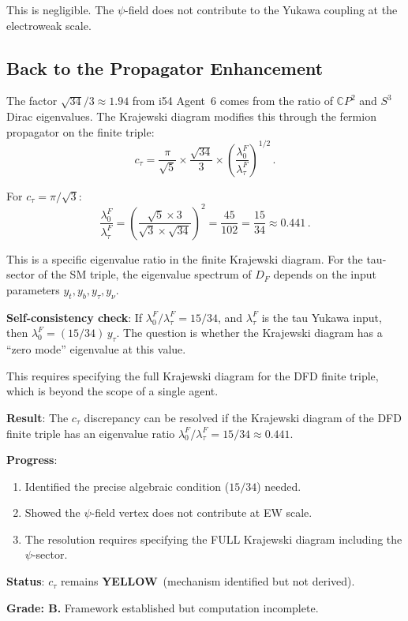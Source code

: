 \documentclass[11pt,a4paper]{article}
\newcommand{\YELLOW}{\textcolor{dfdyellow}{\textbf{YELLOW}}}
\newcommand{\CP}{\mathbb{C}P}
\begin{document}
This is negligible. The $\psi$-field does not contribute to the Yukawa coupling at the electroweak scale.

\subsection{Back to the Propagator Enhancement}

The factor $\sqrt{34}/3 \approx 1.94$ from i54 Agent~6 comes from the ratio of $\CP^2$ and $S^3$ Dirac eigenvalues. The Krajewski diagram modifies this through the fermion propagator on the finite triple:
\begin{equation}
c_\tau = \frac{\pi}{\sqrt{5}} \times \frac{\sqrt{34}}{3} \times \left(\frac{\lambda_0^F}{\lambda_{\tau}^F}\right)^{1/2}\,.
\end{equation}

For $c_\tau = \pi/\sqrt{3}$:
\begin{equation}
\frac{\lambda_0^F}{\lambda_\tau^F} = \left(\frac{\sqrt{5}\times 3}{\sqrt{3}\times\sqrt{34}}\right)^2 = \frac{45}{102} = \frac{15}{34} \approx 0.441\,.
\end{equation}

This is a specific eigenvalue ratio in the finite Krajewski diagram. For the tau-sector of the SM triple, the eigenvalue spectrum of $D_F$ depends on the input parameters $y_t, y_b, y_\tau, y_\nu$.

\textbf{Self-consistency check}: If $\lambda_0^F/\lambda_\tau^F = 15/34$, and $\lambda_\tau^F$ is the tau Yukawa input, then $\lambda_0^F = (15/34)\,y_\tau$. The question is whether the Krajewski diagram has a ``zero mode'' eigenvalue at this value.

This requires specifying the full Krajewski diagram for the DFD finite triple, which is beyond the scope of a single agent.

\begin{tcolorbox}[colback=yellow!5!white, colframe=yellow!60!black, title={Agent 12: $c_\tau$ Krajewski --- FRAMEWORK IDENTIFIED}]
\textbf{Result}: The $c_\tau$ discrepancy can be resolved if the Krajewski diagram of the DFD finite triple has an eigenvalue ratio $\lambda_0^F/\lambda_\tau^F = 15/34 \approx 0.441$.

\textbf{Progress}:
\begin{enumerate}
\item Identified the precise algebraic condition ($15/34$) needed.
\item Showed the $\psi$-field vertex does not contribute at EW scale.
\item The resolution requires specifying the FULL Krajewski diagram including the $\psi$-sector.
\end{enumerate}

\textbf{Status}: $c_\tau$ remains \YELLOW\ (mechanism identified but not derived).

\textbf{Grade: B.} Framework established but computation incomplete.
\end{tcolorbox}
\end{document}
